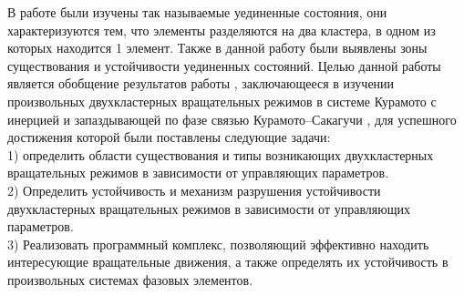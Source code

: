 В работе \cite{slava} были изучены так называемые уединенные состояния, они характеризуются тем, что элементы разделяются на два кластера,
в одном из которых находится 1 элемент. Также в данной работу были выявлены зоны существования и устойчивости уединенных состояний.
Целью данной работы является обобщение результатов работы \cite{slava}, заключающееся в изучении
произвольных двухкластерных вращательных режимов в системе Курамото
с инерцией и запаздывающей по фазе связью Курамото--Сакагучи \cite{Sakaguchi}, для успешного достижения которой были поставлены следующие задачи: \\
1) определить области существования и типы возникающих двухкластерных вращательных режимов в зависимости от управляющих параметров. \\
2) Определить устойчивость и механизм разрушения устойчивости двухкластерных вращательных режимов в зависимости от управляющих параметров. \\
3) Реализовать программный комплекс, позволяющий эффективно находить интересующие вращательные движения, а также определять
их устойчивость в произвольных системах фазовых элементов.
